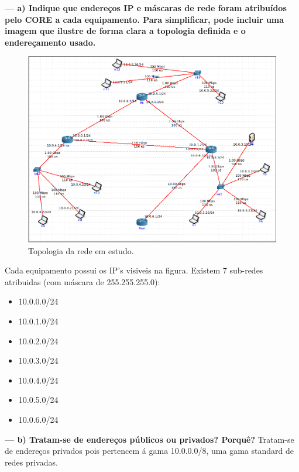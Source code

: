 \documentclass[a4paper]{article}
\begin{document}
\textbf{--- a) Indique que endereços IP e máscaras de rede foram atribuídos pelo CORE a cada equipamento. Para simplificar, pode incluir uma imagem que ilustre de forma clara a topologia definida e o endereçamento usado.}\newline
\begin{figure}[h]
    \centering
    \includegraphics[scale=0.3]{parte2/topologia.png}\newline
    \caption{Topologia da rede em estudo.}
    \label{fig:my_label}
\end{figure}
\clearpage
Cada equipamento possui os IP's visiveis na figura. Existem 7 sub-redes atribuidas (com máscara de 255.255.255.0):
\begin{itemize}
    \item 10.0.0.0/24
    \item 10.0.1.0/24
    \item 10.0.2.0/24
    \item 10.0.3.0/24
    \item 10.0.4.0/24
    \item 10.0.5.0/24
    \item 10.0.6.0/24
\end{itemize}

\vspace{1cm}

\textbf{--- b) Tratam-se de endereços públicos ou privados? Porquê?}\newline
Tratam-se de endereços privados pois pertencem á gama 10.0.0.0/8, uma gama standard de redes privadas.

\vspace{1cm}
\end{document}
